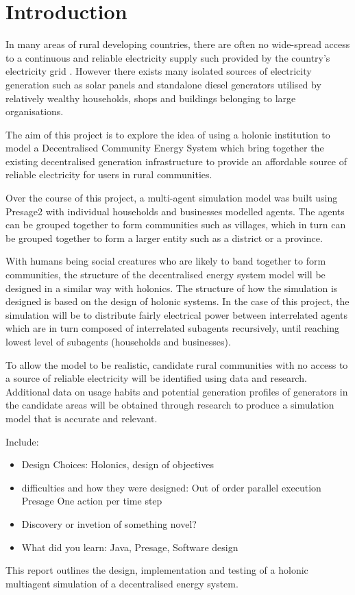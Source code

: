 \chapter{Introduction}
\label{introduction}

In many areas of rural developing countries, there are often no wide-spread access to a continuous and reliable electricity supply such provided by the country's electricity grid \cite{IEA-web:2015}. However there exists many isolated sources of electricity generation such as solar panels and standalone diesel generators utilised by relatively wealthy households, shops and buildings belonging to large organisations. 

The aim of this project is to explore the idea of using a holonic institution to model a Decentralised Community Energy System which bring together the existing decentralised generation infrastructure to provide an affordable source of reliable electricity for users in rural communities. 

Over the course of this project, a multi-agent simulation model was built using Presage2 with individual households and businesses modelled agents. The agents can be grouped together to form communities such as villages, which in turn can be grouped together to form a larger entity such as a district or a province. 

With humans being social creatures who are likely to band together to form communities, the structure of the decentralised energy system model will be designed in a similar way with holonics. The structure of how the simulation is designed is based on the design of holonic systems. In the case of this project, the simulation will be to distribute fairly electrical power between interrelated agents which are in turn composed of interrelated subagents recursively, until reaching lowest level of subagents (households and businesses). 

To allow the model to be realistic, candidate rural communities with no access to a source of reliable electricity will be identified using data and research. Additional data on usage habits and potential generation profiles of generators in the candidate areas will be obtained through research to produce a simulation model that is accurate and relevant.

Include:
\begin{itemize}
\item Design Choices: Holonics, design of objectives
\item difficulties and how they were designed:
\subitem Out of order parallel execution
\subitem Presage
\subitem One action per time step
\item Discovery or invetion of something novel?
\item What did you learn:
\subitem Java, Presage, Software design
\end{itemize}


This report outlines the design, implementation and testing of a holonic multiagent simulation of a decentralised energy system. 
